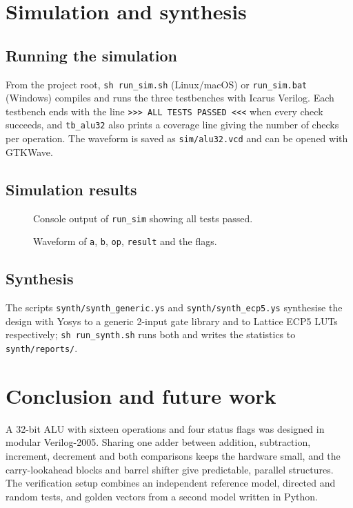 \documentclass[11pt,a4paper]{article}
\begin{document}
\section{Simulation and synthesis}
\subsection{Running the simulation}
From the project root, \texttt{sh run\_sim.sh} (Linux/macOS) or \texttt{run\_sim.bat} (Windows) compiles and runs the three testbenches with Icarus Verilog. Each testbench ends with the line \texttt{>>> ALL TESTS PASSED <<<} when every check succeeds, and \texttt{tb\_alu32} also prints a coverage line giving the number of checks per operation. The waveform is saved as \texttt{sim/alu32.vcd} and can be opened with GTKWave.

\subsection{Simulation results}
\begin{figure}[H]\centering
{}
\caption{Console output of \texttt{run\_sim} showing all tests passed.}
\end{figure}
\begin{figure}[H]\centering
{}
\caption{Waveform of \texttt{a}, \texttt{b}, \texttt{op}, \texttt{result} and the flags.}
\end{figure}

\subsection{Synthesis}
The scripts \texttt{synth/synth\_generic.ys} and \texttt{synth/synth\_ecp5.ys} synthesise the design with Yosys to a generic 2-input gate library and to Lattice ECP5 LUTs respectively; \texttt{sh run\_synth.sh} runs both and writes the statistics to \texttt{synth/reports/}.

\section{Conclusion and future work}
A 32-bit ALU with sixteen operations and four status flags was designed in modular Verilog-2005. Sharing one adder between addition, subtraction, increment, decrement and both comparisons keeps the hardware small, and the carry-lookahead blocks and barrel shifter give predictable, parallel structures. The verification setup combines an independent reference model, directed and random tests, and golden vectors from a second model written in Python.
\end{document}

